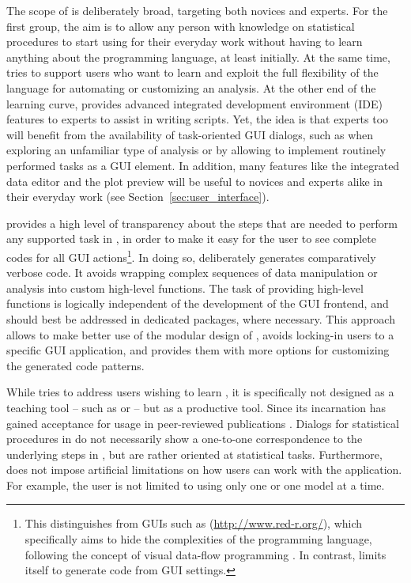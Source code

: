 The scope of  is deliberately broad, targeting both  novices and experts.
For the first group, the aim is to allow any person with knowledge on
statistical procedures to start using  for their everyday work 
without having to learn anything about the  programming language,
at least initially. At the same time,  tries to support users who want to learn and
exploit the full flexibility of the  language for automating or customizing
an analysis. At the other end of the learning curve,  provides advanced integrated development environment (IDE)
features to  experts to assist in writing  scripts. Yet, the idea
is that  experts too will benefit from the availability of task-oriented GUI
dialogs, such as when exploring an unfamiliar type of analysis
or by allowing to implement routinely performed tasks as a GUI element. In
addition, many features like the integrated data editor and the plot preview 
will be useful to  novices and  experts alike in their everyday work
(see Section~\ref{sec:user_interface}).

 provides a high level of transparency about the steps that are needed to
perform any supported task in , in order to make it easy for the user to see
complete codes for all GUI actions\footnote{
  This distinguishes  from  GUIs such as  (\url{http://www.red-r.org/}), which 
  specifically aims to hide the complexities of the  programming language, following the concept of visual data-flow 
  programming \citep{Sutherland1966}. In contrast,  limits itself to generate  code from GUI settings.
}. In doing so,  deliberately generates
comparatively verbose code. It avoids wrapping complex sequences of data
manipulation or analysis into custom high-level  functions. The task of
providing high-level functions is logically independent of the development of the
GUI frontend, and should best be addressed in dedicated  packages, where necessary.
This approach allows to make better use of the modular design of , avoids
locking-in users to a specific GUI application, and provides them with more options for
customizing the generated code patterns.

While  tries to address users wishing to learn , it is specifically not
designed as a teaching tool -- such as  \citep{Fox2005} or  \citep{TeachingDemos2010} -- but as
a productive tool. Since its incarnation  has gained acceptance for usage in peer-reviewed 
publications \citep{Zou2008, Zou2009, Rugg-Gunn2010, Yang2011, Roediger2011, Roediger_VS}.
Dialogs for statistical procedures in  do not
necessarily show a one-to-one correspondence to the underlying steps in , but are
rather oriented at statistical tasks. Furthermore,  does not impose
artificial limitations on how users can work with the application. For example,
the user is not limited to using only one  or one model at a
time.

